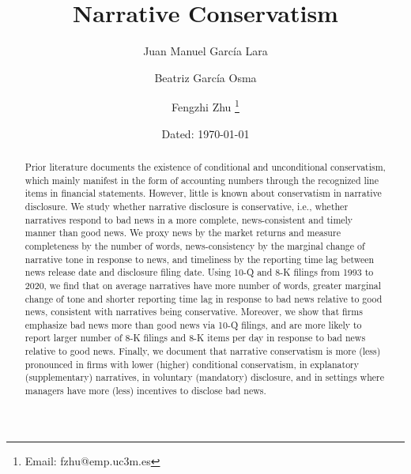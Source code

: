\documentclass[a4paper]{article}
\begin{document}
	
	\title{Narrative Conservatism}

	\author{\vspace{1cm}Juan Manuel Garc\'ia Lara}
	
	\author{Beatriz Garc\'ia Osma}
	
	\author{Fengzhi Zhu%
		\thanks{Email: fzhu@emp.uc3m.es}}
	
	
	\date{\small Dated: \today}
	
	\maketitle
	
\thispagestyle{empty}
\begin{spacing}{2}

\begin{abstract}
	\begin{normalsize}
	\noindent
	Prior literature documents the existence of conditional and unconditional conservatism, which mainly manifest in the form of accounting numbers through the recognized line items in financial statements. However, little is known about conservatism in narrative disclosure. We study whether narrative disclosure is conservative, i.e., whether narratives respond to bad news in a more complete, news-consistent and timely manner than good news. We proxy news by the market returns and measure completeness by the number of words, news-consistency by the marginal change of narrative tone in response to news, and timeliness by the reporting time lag between news release date and disclosure filing date. Using 10-Q and 8-K filings from 1993 to 2020, we find that on average narratives have more number of words, greater marginal change of tone and shorter reporting time lag in response to bad news relative to good news, consistent with narratives being conservative. Moreover, we show that firms emphasize bad news more than good news via 10-Q filings, and are more likely to report larger number of 8-K filings and 8-K items per day in response to bad news relative to good news. Finally, we document that narrative conservatism is more (less) pronounced in firms with lower (higher) conditional conservatism, in explanatory (supplementary) narratives, in voluntary (mandatory) disclosure, and in settings where managers have more (less) incentives to disclose bad news.
	\\


\end{normalsize}
\end{abstract}
\end{spacing}
\end{document}
